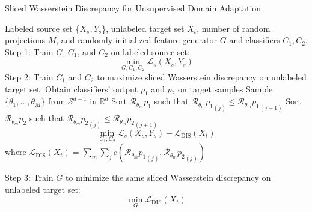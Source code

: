 \documentclass[10pt,twocolumn,letterpaper]{article}
\begin{document}
\begin{algorithm}[t!]
\footnotesize
\caption{Sliced Wasserstein Discrepancy for Unsupervised Domain Adaptation}
\label{alg:swd}
\begin{algorithmic}
\REQUIRE Labeled source set \{$X_{s}, Y_{s}$\}, unlabeled target set $X_{t}$, number of random projections $M$, and randomly initialized feature generator $G$ and classifiers $C_1, C_2$.
\STATE Step 1: Train $G$, $C_1$, and $C_2$ on labeled source set:
\STATE
\setlength{\leftskip}{8.8mm}
\vspace{-2.5mm}
 \begin{equation*}
   \min_{G, C_1, C_2} \mathcal{L}_s (X_{s},Y_{s})
 \end{equation*}
\setlength{\leftskip}{0pt}
 \vspace{-2mm}
\STATE Step 2: Train $C_1$ and $C_2$ to maximize sliced Wasserstein discrepancy
\STATE
\setlength{\leftskip}{8.8mm}
 \vspace{-3.5mm}
on unlabeled target set:
\STATE Obtain classifiers' output ${p_1}$ and ${p_2}$ on target samples
\STATE Sample $\{\theta_1,...,\theta_M\}$ from $\mathcal{S}^{d-1}$ in $\mathbb{R}^d$
\STATE Sort ${\mathcal{R}_{\theta_m}} {p_1}$ such that ${{\mathcal{R}_{\theta_m}} {p_1}_{(j)}} \leq {{\mathcal{R}_{\theta_m}} {p_1}_{(j+1)}}$ 
\STATE Sort ${\mathcal{R}_{\theta_m}} {p_2}$ such that ${{\mathcal{R}_{\theta_m}} {p_2}_{(j)}} \leq {{\mathcal{R}_{\theta_m}} {p_2}_{(j+1)}}$
 \vspace{-1mm}
 \begin{equation*}
  \min_{C_1, C_2} \mathcal{L}_s (X_{s},Y_{s}) - \mathcal{L}_{\text{DIS}}(X_{t})
 \end{equation*}
 \vspace{-3mm}
\STATE where $\mathcal{L}_{\text{DIS}}(X_{t}) = \sum\limits_{m} \sum\limits_{j}  c({{\mathcal{R}_{\theta_m}} {p_1}_{(j)}}, {{\mathcal{R}_{\theta_m}} {p_2}_{(j)}})$

\setlength{\leftskip}{0pt}
\STATE Step 3: Train $G$ to minimize the same sliced Wasserstein discrepancy
\STATE
\setlength{\leftskip}{8.8mm}
\vspace{-3.5mm}
on unlabeled target set:
 \vspace{-1.5mm}
 \begin{equation*}
  \min_{G} \mathcal{L}_{\text{DIS}}(X_{t})
 \end{equation*}
\setlength{\leftskip}{0pt}
 \vspace{-5mm}
\ENDWHILE
\end{algorithmic}
\end{algorithm} 
\end{document}
